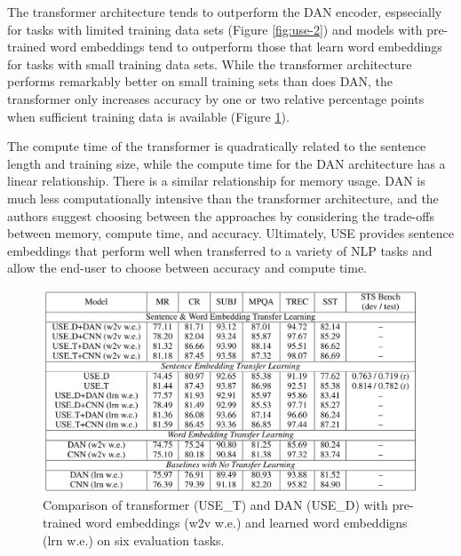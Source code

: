 The transformer architecture tends to outperform the DAN encoder, espsecially for tasks with limited training data sets (Figure \ref{fig:use-2}) and models with pre-trained word embeddings tend to outperform those that learn word embeddings for tasks with small training data sets. While the transformer architecture performs remarkably better on small training sets than does DAN, the transformer only increases accuracy by one or two relative percentage points when sufficient training data is available (Figure \ref{fig:use-1}). 

The compute time of the transformer is quadratically related to the sentence length and training size, while the compute time for the DAN architecture has a linear relationship. There is a similar relationship for memory usage. DAN is much less computationally intensive than the transformer architecture, and the authors suggest choosing between the approaches by considering the trade-offs between memory, compute time, and accuracy. Ultimately, USE provides sentence embeddings that perform well when transferred to a variety of NLP tasks and allow the end-user to choose between accuracy and compute time.

\newpage



\begin{figure}[h!]
\centering
  \includegraphics[width=1\linewidth]{files/use-2.png}
  \caption{Comparison of transformer (USE\_T) and DAN (USE\_D) with pre-trained word embeddings (w2v w.e.) and learned word embeddigns (lrn w.e.) on six  evaluation tasks.}
  \label{fig:use-1}
\end{figure}


